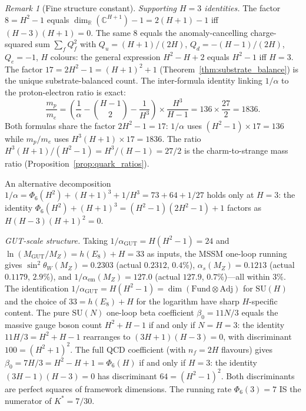 \documentclass[11pt,a4paper]{article}
\theoremstyle{definition}
\theoremstyle{remark}
\newtheorem{remark}[theorem]{Remark}
\newcommand{\C}{\mathbb{C}}
\newcommand{\R}{\mathbb{R}}
\newcommand{\SU}{\mathrm{SU}}
\begin{document}
\begin{remark}[Fine structure constant]
\emph{Supporting $H=3$ identities.} The factor $8=H^2-1$ equals $\dim_\R(\C^{H+1})-1=2(H+1)-1$ iff $(H-3)(H+1)=0$. The same $8$ equals the anomaly-cancelling charge-squared sum $\sum_f Q_f^2$ with $Q_u=(H\!+\!1)/(2H)$, $Q_d=-(H\!-\!1)/(2H)$, $Q_e=-1$, $H$ colours: the general expression $H^2-H+2$ equals $H^2-1$ iff $H=3$. The factor $17=2H^2-1=(H+1)^2+1$ (Theorem~\ref{thm:substrate_balance}) is the unique substrate-balanced count. The inter-formula identity linking $1/\alpha$ to the proton-electron ratio is exact:
\begin{equation}\label{eq:alpha_mp_connection}
\frac{m_p}{m_e} = \!\left(\frac{1}{\alpha}-\binom{H\!-\!1}{2}-\frac{1}{H^3}\right)\!\times\frac{H^3}{H-1} = 136\times\frac{27}{2} = 1836.
\end{equation}
Both formulas share the factor $2H^2-1=17$: $1/\alpha$ uses $(H^2\!-\!1)\times 17=136$ while $m_p/m_e$ uses $H^3(H\!+\!1)\times 17=1836$. The ratio $H^3(H\!+\!1)/(H^2\!-\!1)=H^3/(H\!-\!1)=27/2$ is the charm-to-strange mass ratio (Proposition~\ref{prop:quark_ratios}).

An alternative decomposition $1/\alpha=\Phi_6(H^2)+(H+1)^3+1/H^3=73+64+1/27$ holds only at $H=3$: the identity $\Phi_6(H^2)+(H+1)^3=(H^2-1)(2H^2-1)+1$ factors as $H(H-3)(H+1)^2=0$.

\emph{GUT-scale structure.} Taking $1/\alpha_\mathrm{GUT}=H(H^2-1)=24$ and $\ln(M_\mathrm{GUT}/M_Z)=h(E_8)+H=33$ as inputs, the MSSM one-loop running gives $\sin^2\theta_W(M_Z)=0.2303$ (actual $0.2312$, $0.4\%$), $\alpha_s(M_Z)=0.1213$ (actual $0.1179$, $2.9\%$), and $1/\alpha_\mathrm{em}(M_Z)=127.0$ (actual $127.9$, $0.7\%$)---all within $3\%$. The identification $1/\alpha_\mathrm{GUT}=H(H^2-1)=\dim(\mathrm{Fund}\otimes\mathrm{Adj})$ for $\SU(H)$ and the choice of $33=h(E_8)+H$ for the logarithm have sharp $H$-specific content. The pure $\SU(N)$ one-loop beta coefficient $\beta_0=11N/3$ equals the massive gauge boson count $H^2+H-1$ if and only if $N=H=3$: the identity $11H/3=H^2+H-1$ rearranges to $(3H+1)(H-3)=0$, with discriminant $100=(H^2+1)^2$. The full QCD coefficient (with $n_f=2H$ flavours) gives $\beta_0=7H/3=H^2-H+1=\Phi_6(H)$ if and only if $H=3$: the identity $(3H-1)(H-3)=0$ has discriminant $64=(H^2-1)^2$. Both discriminants are perfect squares of framework dimensions. The running rate $\Phi_6(3)=7$ IS the numerator of $K^*=7/30$.


\end{remark}
\end{document}
